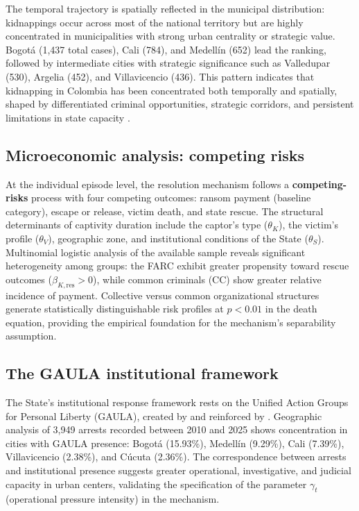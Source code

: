 \documentclass[12pt]{article}
\theoremstyle{definition}
\theoremstyle{remark}
\newcommand{\1}{\mathbf{1}}
\begin{document}
The temporal trajectory is spatially reflected in the municipal distribution: kidnappings occur across most of the national territory but are highly concentrated in municipalities with strong urban centrality or strategic value. Bogotá (1,437 total cases), Cali (784), and Medellín (652) lead the ranking, followed by intermediate cities with strategic significance such as Valledupar (530), Argelia (452), and Villavicencio (436). This pattern indicates that kidnapping in Colombia has been concentrated both temporally and spatially, shaped by differentiated criminal opportunities, strategic corridors, and persistent limitations in state capacity \parencite{Pires2014}.

\subsection{Microeconomic analysis: competing risks}

At the individual episode level, the resolution mechanism follows a \textbf{competing-risks} process with four competing outcomes: ransom payment (baseline category), escape or release, victim death, and state rescue. The structural determinants of captivity duration include the captor's type ($\theta_K$), the victim's profile ($\theta_V$), geographic zone, and institutional conditions of the State ($\theta_S$). Multinomial logistic analysis of the available sample reveals significant heterogeneity among groups: the FARC exhibit greater propensity toward rescue outcomes ($\beta_{K,\text{res}} > 0$), while common criminals (CC) show greater relative incidence of payment. Collective versus common organizational structures generate statistically distinguishable risk profiles at $p < 0.01$ in the death equation, providing the empirical foundation for the mechanism's separability assumption.

\subsection{The GAULA institutional framework}

The State's institutional response framework rests on the Unified Action Groups for Personal Liberty (GAULA), created by \textcite{ley282_1996} and reinforced by \textcite{decreto864_1998}. Geographic analysis of 3,949 arrests recorded between 2010 and 2025 shows concentration in cities with GAULA presence: Bogotá (15.93\%), Medellín (9.29\%), Cali (7.39\%), Villavicencio (2.38\%), and Cúcuta (2.36\%). The correspondence between arrests and institutional presence suggests greater operational, investigative, and judicial capacity in urban centers, validating the specification of the parameter $\gamma_t$ (operational pressure intensity) in the mechanism.
\end{document}
